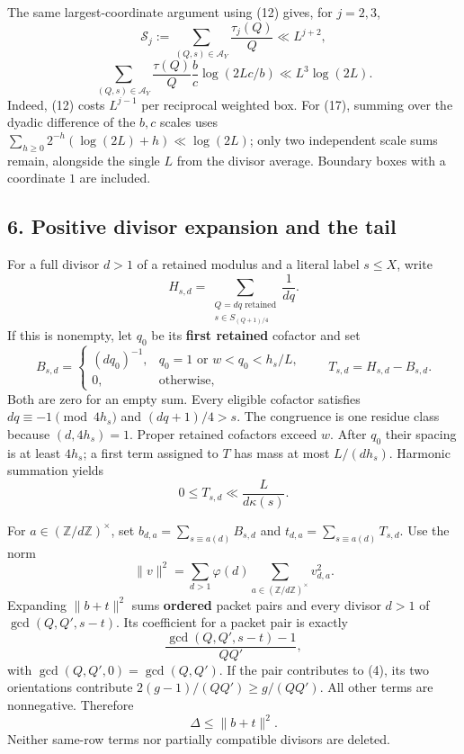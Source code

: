 \documentclass[
  english,
  11pt,
]{article}
\begin{document}
The same largest-coordinate argument using (12) gives, for \(j=2,3\), \[
\mathcal S_j:=\sum_{(Q,s)\in\mathcal A_Y}\frac{\tau_j(Q)}Q
\ll L^{j+2}, \tag{16}
\] \[
\sum_{(Q,s)\in\mathcal A_Y}\frac{\tau(Q)}Q
\frac bc\log(2Lc/b)\ll L^3\log(2L). \tag{17}
\] Indeed, (12) costs \(L^{j-1}\) per reciprocal weighted box. For (17),
summing over the dyadic difference of the \(b,c\) scales uses
\(\sum_{h\ge0}2^{-h}(\log(2L)+h)\ll\log(2L)\); only two independent
scale sums remain, alongside the single \(L\) from the divisor average.
Boundary boxes with a coordinate \(1\) are included.

\subsection{6. Positive divisor expansion and the
tail}\label{positive-divisor-expansion-and-the-tail}

For a full divisor \(d>1\) of a retained modulus and a literal label
\(s\le X\), write \[
H_{s,d}=\sum_{\substack{Q=dq\text{ retained}\\s\in S_{(Q+1)/4}}}\frac1{dq}.
\] If this is nonempty, let \(q_0\) be its \textbf{first retained}
cofactor and set \[
B_{s,d}=\begin{cases}(dq_0)^{-1},&q_0=1\text{ or }w<q_0<h_s/L,\\
0,&\text{otherwise},\end{cases}\qquad T_{s,d}=H_{s,d}-B_{s,d}.
\] Both are zero for an empty sum. Every eligible cofactor satisfies
\(dq\equiv-1\pmod{4h_s}\) and \((dq+1)/4>s\). The congruence is one
residue class because \((d,4h_s)=1\). Proper retained cofactors exceed
\(w\). After \(q_0\) their spacing is at least \(4h_s\); a first term
assigned to \(T\) has mass at most \(L/(dh_s)\). Harmonic summation
yields \[
0\le T_{s,d}\ll\frac{L}{d\kappa(s)}. \tag{18}
\]

For \(a\in(\mathbb Z/d\mathbb Z)^\times\), set
\(b_{d,a}=\sum_{s\equiv a(d)}B_{s,d}\) and
\(t_{d,a}=\sum_{s\equiv a(d)}T_{s,d}\). Use the norm \[
\|v\|^2=\sum_{d>1}\varphi(d)\sum_{a\in(\mathbb Z/d\mathbb Z)^\times}v_{d,a}^2.
\] Expanding \(\|b+t\|^2\) sums \textbf{ordered} packet pairs and every
divisor \(d>1\) of \(\gcd(Q,Q',s-t)\). Its coefficient for a packet pair
is exactly \[
\frac{\gcd(Q,Q',s-t)-1}{QQ'}, \tag{19}
\] with \(\gcd(Q,Q',0)=\gcd(Q,Q')\). If the pair contributes to (4), its
two orientations contribute \(2(g-1)/(QQ')\ge g/(QQ')\). All other terms
are nonnegative. Therefore \[
\Delta\le\|b+t\|^2. \tag{20}
\] Neither same-row terms nor partially compatible divisors are deleted.
\end{document}
